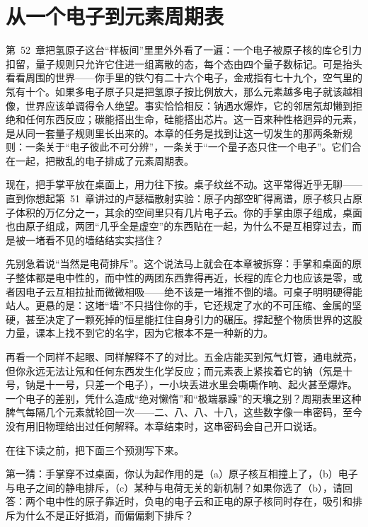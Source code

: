 \chapter{从一个电子到元素周期表}

第~52~章把氢原子这台“样板间”里里外外看了一遍：一个电子被原子核的库仑引力扣留，量子规则只允许它住进一组离散的态，每个态由四个量子数标记。可是抬头看看周围的世界——你手里的铁勺有二十六个电子，金戒指有七十九个，空气里的氖有十个。如果多电子原子只是把氢原子按比例放大，那么元素越多电子就该越相像，世界应该单调得令人绝望。事实恰恰相反：钠遇水爆炸，它的邻居氖却懒到拒绝和任何东西反应；碳能搭出生命，硅能搭出芯片。这一百来种性格迥异的元素，是从同一套量子规则里长出来的。本章的任务是找到让这一切发生的那两条新规则：一条关于“电子彼此不可分辨”，一条关于“一个量子态只住一个电子”。它们合在一起，把散乱的电子排成了元素周期表。


现在，把手掌平放在桌面上，用力往下按。桌子纹丝不动。这平常得近乎无聊——直到你想起第~51~章讲过的卢瑟福散射实验：原子内部空旷得离谱，原子核只占原子体积的万亿分之一，其余的空间里只有几片电子云。你的手掌由原子组成，桌面也由原子组成，两团“几乎全是虚空”的东西贴在一起，为什么不是互相穿过去，而是被一堵看不见的墙结结实实挡住？

先别急着说“当然是电荷排斥”。这个说法马上就会在本章被拆穿：手掌和桌面的原子整体都是电中性的，而中性的两团东西靠得再近，长程的库仑力也应该是零，或者因电子云互相拉扯而微微相吸——绝不该是一堵推不倒的墙。可桌子明明硬得能站人。更悬的是：这堵“墙”不只挡住你的手，它还规定了水的不可压缩、金属的坚硬，甚至决定了一颗死掉的恒星能扛住自身引力的碾压。撑起整个物质世界的这股力量，课本上找不到它的名字，因为它根本不是一种新的力。

再看一个同样不起眼、同样解释不了的对比。五金店能买到氖气灯管，通电就亮，但你永远无法让氖和任何东西发生化学反应；而元素表上紧挨着它的钠（氖是十号，钠是十一号，只差一个电子），一小块丢进水里会嘶嘶作响、起火甚至爆炸。一个电子的差别，凭什么造成“绝对懒惰”和“极端暴躁”的天壤之别？周期表里这种脾气每隔几个元素就轮回一次——二、八、八、十八，这些数字像一串密码，至今没有用旧物理给出过任何解释。本章结束时，这串密码会自己开口说话。


在往下读之前，把下面三个预测写下来。

第一猜：手掌穿不过桌面，你认为起作用的是（a）原子核互相撞上了，（b）电子与电子之间的静电排斥，（c）某种与电荷无关的新机制？如果你选了（b），请回答：两个电中性的原子靠近时，负电的电子云和正电的原子核同时存在，吸引和排斥为什么不是正好抵消，而偏偏剩下排斥？

